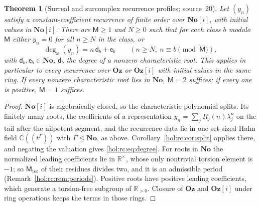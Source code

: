 \documentclass[11pt]{article}
\numberwithin{equation}{section}
\newtheorem{theorem}{Theorem}[section]
\theoremstyle{definition}
\theoremstyle{remark}
\newcommand{\C}{\mathbb C}
\newcommand{\R}{\mathbb R}
\newcommand{\No}{\mathbf{No}}
\newcommand{\Oz}{\mathbf{Oz}}
\begin{document}
\begin{theorem}[Surreal and surcomplex recurrence profiles; source~20]
\label{hol:rc:thm:surreal}
Let $(y_n)$ satisfy a constant-coefficient recurrence of finite order over
$\No[i]$, with initial values in $\No[i]$. There are $\mathsf M\ge1$ and
$N\ge0$ such that for each class $b$ modulo $\mathsf M$ either $y_n=0$ for all
$n\ge N$ in the class, or
\begin{equation}\label{hol:rc:eq:degree}
 \deg_\omega(y_n)=n\,\mathsf d_b+\mathsf e_b\qquad(n\ge N,\
 n\equiv b\pmod{\mathsf M}),
\end{equation}
with $\mathsf d_b,\mathsf e_b\in\No$, $\mathsf d_b$ the degree of a nonzero
characteristic root. This applies in particular to every recurrence over $\Oz$
or $\Oz[i]$ with initial values in the same ring. If every nonzero
characteristic root lies in $\No$, $\mathsf M=2$ suffices; if every one is
positive, $\mathsf M=1$ suffices.
\end{theorem}

\begin{proof}
$\No[i]$ is algebraically closed, so the characteristic polynomial splits.
Its finitely many roots, the coefficients of a representation
$y_n=\sum_jR_j(n)\lambda_j^n$ on the tail after the nilpotent segment, and the
recurrence data lie in one set-sized Hahn field $\C((t^\Gamma))$ with
$\Gamma\le\No$, as above. Corollary~\ref{hol:rc:cor:split} applies there, and
negating the valuation gives \eqref{hol:rc:eq:degree}. For roots in $\No$ the
normalized leading coefficients lie in $\R^\times$, whose only nontrivial
torsion element is $-1$; so $\mathsf M_{\mathrm{tor}}$ of their residues
divides two, and it is an admissible period
(Remark~\ref{hol:rc:rem:periods}). Positive roots have positive leading
coefficients, which generate a torsion-free subgroup of $\R_{>0}$. Closure of
$\Oz$ and $\Oz[i]$ under ring operations keeps the terms in those rings.
\end{proof}
\end{document}
